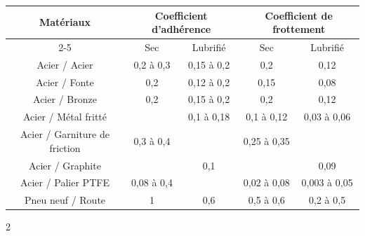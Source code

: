 \documentclass[11pt,oneside]{article}
\begin{document}
\begin{center}
\begin{tabular}{|c||c|c||c|c|}
\hline
\multirow{2}{*}{Matériaux} 
& \multicolumn{2}{c||}{Coefficient d'adhérence} & \multicolumn{2}{c|}{Coefficient de frottement} \\
\cline{2-5}
& Sec & Lubrifié & Sec & Lubrifié \\
\hline
\hline
Acier / Acier & 0,2 à 0,3 & 0,15 à 0,2 & 0,2 & 0,12 \\ \hline
Acier / Fonte & 0,2 & 0,12 à 0,2 & 0,15 & 0,08 \\ \hline
Acier / Bronze & 0,2 & 0,15 à 0,2 & 0,2 & 0,12 \\ \hline
Acier / Métal fritté &  & 0,1 à 0,18 & 0,1 à 0,12 & 0,03 à 0,06 \\ \hline
Acier / Garniture de friction & 0,3 à 0,4 &  & 0,25 à 0,35 &  \\ \hline
Acier / Graphite &  & 0,1 &  & 0,09 \\ \hline
Acier / Palier PTFE & 0,08 à 0,4 &  & 0,02 à 0,08 & 0,003 à 0,05 \\ \hline
Pneu neuf / Route & 1 & 0,6  & 0,5 à 0,6  & 0,2 à 0,5\\ \hline
\end{tabular}
\end{center}

\begin{thebibliography}{2}
\end{thebibliography}
\end{document}
